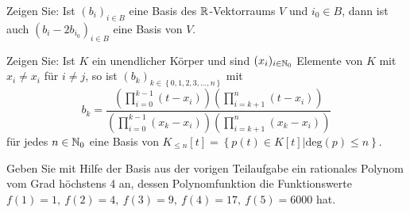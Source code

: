 \begin{Problem}
	\begin{parts}
	\item Zeigen Sie: Ist $(b_i)_{i\in B}$ eine Basis des $\mathbb{R}$-Vektorraums $V$ und $i_0 \in B$, dann ist auch $(b_i - 2b_{i_0} )_{i\in B}$ eine Basis von $V$.
	\item Zeigen Sie: Ist $K$ ein unendlicher Körper und sind $(x_i)_{i\in \mathbb{N}_0}$ Elemente von $K$ mit $x_i\neq x_i$ f\"{u}r $i\neq j$, so ist $(b_k)_{k\in \left\{ 0,1,2,3,\dots,n \right\} }$ mit
		\[
			b_k=\frac{\left(\prod_{i=0}^{k-1}(t-x_i)\right) \left(\prod_{i=k+1}^{n}(t-x_i) \right) }{\left(\prod_{i=0}^{k-1}(x_k-x_i)\right) \left(\prod_{i=k+1}^{n}(x_k-x_i) \right) }
		\] 
		f\"{u}r jedes $n\in \mathbb{N}_0$ eine Basis von $K_{\le n}[t]=\left\{ p(t)\in K[t]|\text{deg}(p)\le n \right\} $.
	\item Geben Sie mit Hilfe der Basis aus der vorigen Teilaufgabe ein rationales Polynom vom Grad höchstens 4 an, dessen Polynomfunktion die Funktionswerte $f(1)=1,~f(2)=4,~f(3)=9,~f(4)=17,~f(5)=6000$ hat. 
	\end{parts}
\end{Problem}
